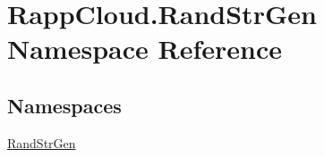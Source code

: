 \hypertarget{namespaceRappCloud_1_1RandStrGen}{\section{Rapp\-Cloud.\-Rand\-Str\-Gen Namespace Reference}
\label{namespaceRappCloud_1_1RandStrGen}
}
\subsection*{Namespaces}
\begin{DoxyCompactItemize}
\item 
\hyperlink{namespaceRappCloud_1_1RandStrGen_1_1RandStrGen}{Rand\-Str\-Gen}
\end{DoxyCompactItemize}
